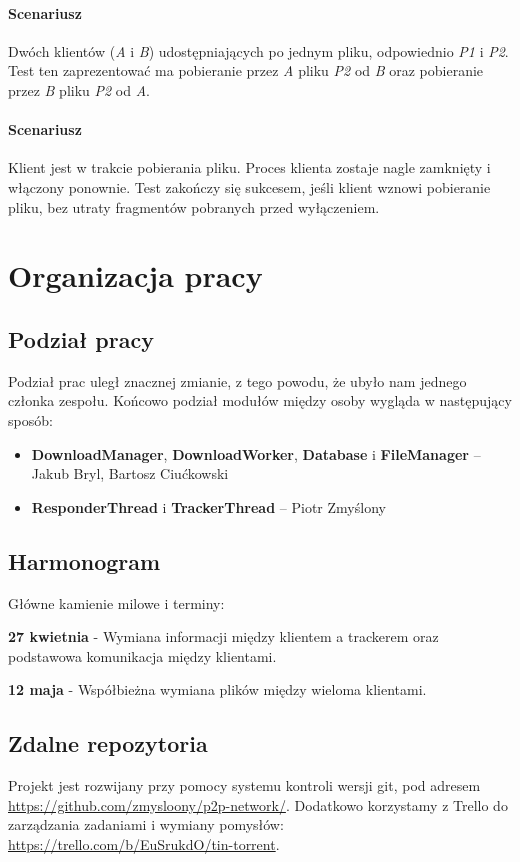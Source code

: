 \documentclass[11pt]{article}
\begin{document}
\paragraph{Scenariusz } Dwóch klientów (\textsl{A} i \textsl{B}) udostępniających po jednym pliku, odpowiednio \textsl{P1} i \textsl{P2}. Test ten zaprezentować ma pobieranie przez \textsl{A} pliku \textsl{P2} od \textsl{B} oraz pobieranie przez \textsl{B} pliku \textsl{P2} od \textsl{A}.
\paragraph{Scenariusz } Klient jest w trakcie pobierania pliku. Proces klienta zostaje nagle zamknięty i włączony ponownie. Test zakończy się sukcesem, jeśli klient wznowi pobieranie pliku, bez utraty fragmentów pobranych przed wyłączeniem.

\section{Organizacja pracy}
\subsection{Podział pracy}
Podział prac uległ znacznej zmianie, z tego powodu, że ubyło nam jednego członka zespołu. Końcowo podział modułów między osoby wygląda w następujący sposób:
\begin{itemize}
\item \textbf{DownloadManager}, \textbf{DownloadWorker}, \textbf{Database} i \textbf{FileManager} -- Jakub Bryl, Bartosz Ciućkowski
\item \textbf{ResponderThread} i \textbf{TrackerThread} -- Piotr Zmyślony
\end{itemize}
\subsection{Harmonogram}
Główne kamienie milowe i terminy:

\textbf{27 kwietnia} - Wymiana informacji między klientem a trackerem oraz podstawowa komunikacja między klientami. 

\textbf{12 maja} - Współbieżna wymiana plików między wieloma klientami. 

\subsection{Zdalne repozytoria}
Projekt jest rozwijany przy pomocy systemu kontroli wersji git, pod adresem \url{https://github.com/zmysloony/p2p-network/}. Dodatkowo korzystamy z Trello do zarządzania zadaniami i wymiany pomysłów: \url{https://trello.com/b/EuSrukdO/tin-torrent}.
\newcommand{\code}[1]{\texttt{#1}}
\end{document}
